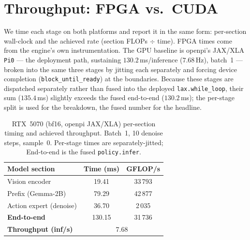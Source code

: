 \documentclass[11pt]{article}
\newcommand{\bfteen}{bf16}
\begin{document}
\section{Throughput: FPGA vs.\ CUDA}
\label{sec:throughput}
We time each stage on both platforms and report it in the same form: per-section
wall-clock and the achieved rate (section FLOPs $\div$ time). FPGA times come
from the engine's own instrumentation. The
GPU baseline is openpi's JAX/XLA \texttt{Pi0} --- the deployment path, sustaining
$130.2$\,ms/inference ($7.68$\,Hz), batch~1 --- broken into the same three stages
by jitting each separately and forcing device completion
(\texttt{block\_until\_ready}) at the boundaries. Because these stages are
dispatched separately rather than fused into the deployed \texttt{lax.while\_loop},
their sum ($135.4$\,ms) slightly exceeds the fused end-to-end ($130.2$\,ms); the
per-stage split is used for the breakdown, the fused number for the headline.

\begin{table}[H]
\centering\small
\caption{RTX~5070 (\bfteen{}, openpi JAX/XLA) per-section timing and achieved
throughput. Batch~1, 10 denoise steps, sample~0. Per-stage times are
separately-jitted; End-to-end is the fused \texttt{policy.infer}.}
\label{tab:timing-gpu}
\begin{tabular}{@{}lcc@{}}
\toprule
\textbf{Model section} & \textbf{Time (ms)} & \textbf{GFLOP/s} \\
\midrule
Vision encoder          & 19.41  & 33\,793 \\
Prefix (Gemma-2B)       & 79.29  & 42\,877 \\
Action expert (denoise) & 36.70  & 2\,035  \\
\midrule
\textbf{End-to-end}     & 130.15 & 31\,736 \\
\textbf{Throughput (inf/s)} & \multicolumn{2}{c}{7.68} \\
\bottomrule
\end{tabular}
\end{table}
\end{document}
